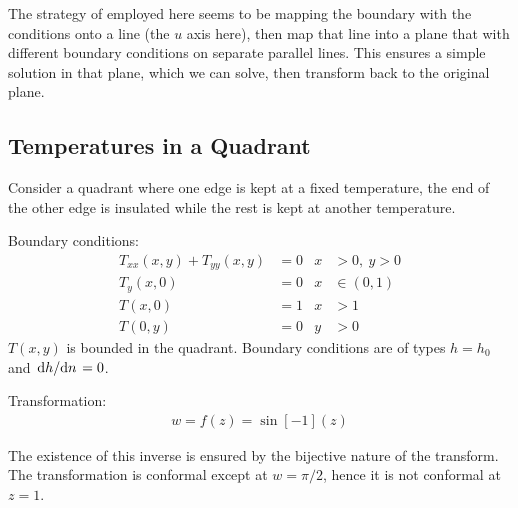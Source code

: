 \documentclass[12pt, english]{book}
\begin{document}
\begin{observation}
\begin{figure}[H]
		\end{figure}
	
		The strategy of employed here seems to be mapping the boundary with the conditions onto a line (the \(u\) axis here), then map that line into a plane that with different boundary conditions on separate parallel lines. This ensures a simple solution in that plane, which we can solve, then transform back to the original plane. 
	\end{observation}
	
	\subsection{Temperatures in a Quadrant} \label{Temperatures in a Quadrant Subsection - Complex}
	
	Consider a quadrant where one edge is kept at a fixed temperature, the end of the other edge is insulated while the rest is kept at another temperature.
	
	Boundary conditions:
	\begin{align*}
		T_{xx}(x,y) + T_{yy}(x,y) &= 0 &
			x&>0, \ y>0 \\
		T_y(x,0) &= 0 & x &\in (0,1) \\
		T(x,0) &= 1 & x&>1 \\
		T(0,y) &= 0 & y&>0
	\end{align*}
	\(T(x,y)\) is bounded in the quadrant. Boundary conditions are of types \(h = h_0\) and \(\dv*{h}{n} = 0\).
	
	Transformation:
	\begin{align*}
		w = f(z) = \sin[-1](z)
	\end{align*}
	
	The existence of this inverse is ensured by the bijective nature of the transform. The transformation is conformal except at \(w = \pi/2\), hence it is not conformal at \(z = 1\).
	
\end{document}
